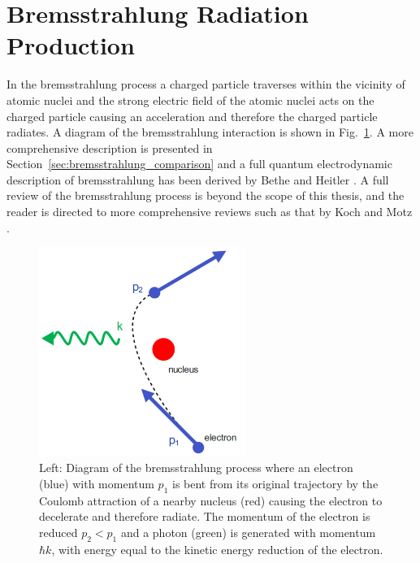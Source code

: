 \documentclass[../main.tex]{subfiles}
\begin{document}
\section{Bremsstrahlung Radiation Production}
\label{sec:bremsstrahlung}

In the bremsstrahlung process a charged particle traverses within the vicinity of atomic nuclei and the strong electric field of the atomic nuclei acts on the charged particle causing an acceleration and therefore the charged particle radiates. A diagram of the bremsstrahlung interaction is shown in Fig.~\ref{fig:brem_intro_diagram}. A more comprehensive description is presented in Section~\ref{sec:bremsstrahlung_comparison} and a full quantum electrodynamic description of bremsstrahlung has been derived by Bethe and Heitler \cite{bethe1934stopping}. A full review of the bremsstrahlung process is beyond the scope of this thesis, and the reader is directed to more comprehensive reviews such as that by Koch and Motz \cite{koch1959bremsstrahlung}. 
\begin{figure}[!h]
\centering
\includegraphics[width=0.6\textwidth]{Figures/Introduction/brem_intro_diagram.pdf}
\caption{Left: Diagram of the bremsstrahlung process where an electron (blue) with momentum $p_{1}$ is bent from its original trajectory by the Coulomb attraction of a nearby nucleus (red) causing the electron to decelerate and therefore radiate. The momentum of the electron is reduced $p_{2} < p_{1}$ and a photon (green) is generated with momentum $\hbar k$, with energy equal to the kinetic energy reduction of the electron.}
\label{fig:brem_intro_diagram}
\end{figure}
\end{document}
